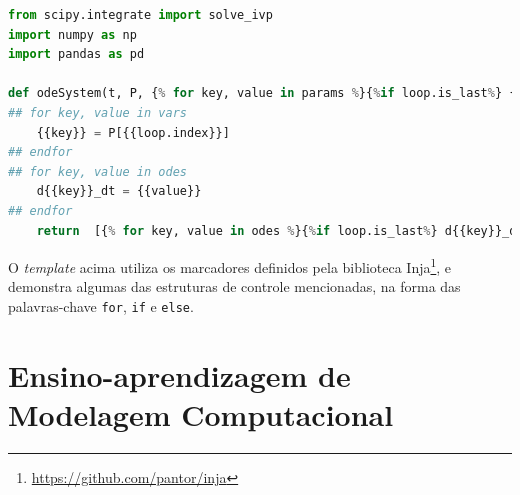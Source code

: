 \documentclass[
	12pt,				%
	openright,			%
	oneside,			%
	a4paper,			%
	main=brazil,
	english,			%
	]{ufsj-abntex2}
\begin{document}
\begin{lstlisting}[language=Python, firstnumber=1]
from scipy.integrate import solve_ivp
import numpy as np
import pandas as pd

def odeSystem(t, P, {% for key, value in params %}{%if loop.is_last%} {{key}} {%else%} {{key}}, {%endif%}{%endfor%}):
## for key, value in vars
    {{key}} = P[{{loop.index}}]
## endfor
## for key, value in odes
    d{{key}}_dt = {{value}}
## endfor     
    return  [{% for key, value in odes %}{%if loop.is_last%} d{{key}}_dt {%else%} d{{key}}_dt, {%endif%}{%endfor%}]
\end{lstlisting}

O \textit{template} acima utiliza os marcadores definidos pela biblioteca Inja\footnote{\href{https://github.com/pantor/inja}{https://github.com/pantor/inja}}, e demonstra algumas das estruturas de controle mencionadas, na forma das palavras-chave \texttt{\textcolor{codepurple}{for}}, \texttt{\textcolor{codepurple}{if}} e \texttt{\textcolor{codepurple}{else}}.






\section{Ensino-aprendizagem de Modelagem Computacional} %
\end{document}
